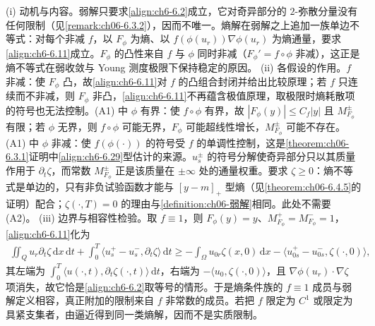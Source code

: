 \documentclass[../../main.tex]{subfiles}%
\begin{document}
\begin{remark}\label{remark:ch06-熵解动机}
(i) 动机与内容。弱解只要求\eqref{align:ch6-6.2}成立，它对奇异部分的 $2$-弥散分量没有任何限制（见\cref{remark:ch06-6.3.2}），因而不唯一。熵解在弱解之上追加一族单边不等式：对每个非减 $f$，以 $F_\phi$ 为熵、以 $f(\phi(u_r))\nabla\phi(u_r)$ 为熵通量，要求\eqref{align:ch6-6.11}成立。$F_\phi$ 的凸性来自 $f$ 与 $\phi$ 同时非减（$F_\phi'=f\circ\phi$ 非减），这正是熵不等式在弱收敛与 Young 测度极限下保持稳定的原因。
(ii) 各假设的作用。$f$ 非减：使 $F_\phi$ 凸，故\eqref{align:ch6-6.11}对 $f$ 的凸组合封闭并给出比较原理；若 $f$ 只连续而不非减，则 $F_\phi$ 非凸，\eqref{align:ch6-6.11}不再蕴含极值原理，取极限时熵耗散项的符号也无法控制。(A1) 中 $\phi$ 有界：使 $f\circ\phi$ 有界，故 $|F_\phi(y)|\leqslant C_f|y|$ 且 $M^\pm_{F_\phi}$ 有限；若 $\phi$ 无界，则 $f\circ\phi$ 可能无界，$F_\phi$ 可能超线性增长，$M^\pm_{F_\phi}$ 可能不存在。(A1) 中 $\phi$ 非减：使 $f(\phi(\cdot))$ 的符号受 $f$ 的单调性控制，这是\cref{theorem:ch06-6.3.1}证明中\eqref{align:ch6-6.29}型估计的来源。$u^\pm_s$ 的符号分解使奇异部分只以其质量作用于 $\partial_t\zeta$，而常数 $M^\pm_{F_\phi}$ 正是该质量在 $\pm\infty$ 处的通量权重。要求 $\zeta\geqslant0$：熵不等式是单边的，只有非负试验函数才能与 $[y-m]_+$ 型熵（见\cref{theorem:ch06-6.4.5}的证明）配合；$\zeta(\cdot,T)=0$ 的理由与\cref{definition:ch06-弱解}相同。此处不需要 (A2)。
(iii) 边界与相容性检验。取 $f\equiv1$，则 $F_\phi(y)=y$、$M^+_{F_\phi}=M^-_{F_\phi}=1$，\eqref{align:ch6-6.11}化为
\begin{align*}
\iint_Q u_r\partial_t\zeta\,\mathrm{d}x\,\mathrm{d}t+\int_0^T\langle u^+_s-u^-_s,\partial_t\zeta\rangle\,\mathrm{d}t
\geqslant-\int_\Omega u_{0r}\zeta(x,0)\,\mathrm{d}x-\langle u^+_{0s}-u^-_{0s},\zeta(\cdot,0)\rangle ,
\end{align*}
其左端为 $\int_0^T\langle u(\cdot,t),\partial_t\zeta(\cdot,t)\rangle\,\mathrm{d}t$，右端为 $-\langle u_0,\zeta(\cdot,0)\rangle$，且 $\nabla\phi(u_r)\cdot\nabla\zeta$ 项消失，故它恰是\eqref{align:ch6-6.2}取等号的情形。于是熵条件族的 $f\equiv1$ 成员与弱解定义相容，真正附加的限制来自 $f$ 非常数的成员。若把 $f$ 限定为 $C^1$ 或限定为具紧支集者，由逼近得到同一类熵解，因而不是实质限制。
\end{remark}
\end{document}
